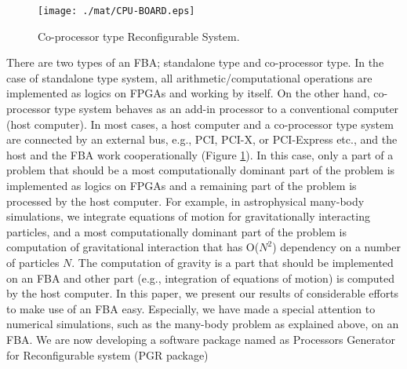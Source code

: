 \documentclass{llncs}
\begin{document}
\begin{figure}[htb]
\begin{center}
\texttt{[image: ./mat/CPU-BOARD.eps]}
\caption{Co-processor type Reconfigurable System.}
\label{CPU-BOARD}
\end{center}
\end{figure}

There are two types of an FBA; standalone type and co-processor type.
In the case of standalone type system, all arithmetic/computational operations
are implemented as logics on FPGAs and working by itself.
On the other hand, co-processor type system behaves as an add-in processor 
to a conventional computer (host computer).
In most cases, a host computer and a co-processor type system 
are connected by an external bus, e.g., PCI, PCI-X, or PCI-Express etc., 
and the host and the FBA work cooperationally (Figure \ref{CPU-BOARD}).
In this case, only a part of a problem
that should be a most computationally dominant part of the problem
is implemented as logics on FPGAs and
a remaining part of the problem is processed by the host computer.
For example, in astrophysical many-body simulations, 
we integrate equations of motion for gravitationally interacting particles,
and a most computationally dominant part of the problem is 
computation of gravitational interaction that has O($N^2$) dependency
on a number of particles $N$.
The computation of gravity is a part that should be implemented on 
an FBA and other part (e.g., integration of equations of motion)
is computed by the host computer.
In this paper, we present our results of considerable efforts
to make use of an FBA easy.
Especially, we have made a special attention to numerical simulations, 
such as the many-body problem as explained above, on an FBA.
We are now developing a software package named as
Processors Generator for Reconfigurable system (PGR package)
\end{document}
